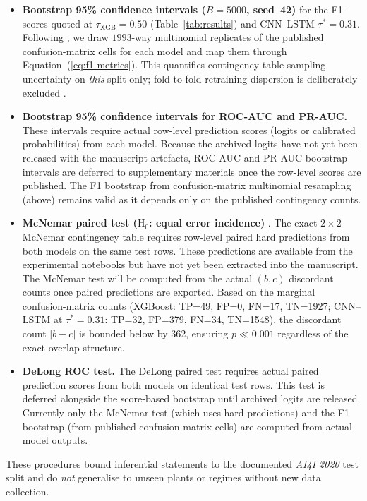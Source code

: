 \documentclass[sensors,article,submit,pdftex,moreauthors]{Definitions/mdpi}
\begin{document}
\begin{itemize}
\item \textbf{Bootstrap 95\% confidence intervals ($B=5000$, seed~42)}
  for the F1-scores quoted at $\tau_{\mathrm{XGB}}{=}0.50$ (Table~\ref{tab:results})
  and CNN--LSTM $\tau^{\ast}=0.31$.
  Following \citet{ref-ci-bootstrap2022}, we draw $1993$-way multinomial
  replicates of the published confusion-matrix cells for each model and map
  them through Equation~(\ref{eq:f1-metrics}).
  This quantifies contingency-table sampling uncertainty on \emph{this}
  split only; fold-to-fold retraining dispersion is deliberately excluded \citep{ref-stat-tests-ml2006}.
\item \textbf{Bootstrap 95\% confidence intervals for ROC-AUC and PR-AUC.}
  These intervals require actual row-level prediction scores (logits or
  calibrated probabilities) from each model.  Because the archived logits have
  not yet been released with the manuscript artefacts, ROC-AUC and PR-AUC
  bootstrap intervals are deferred to supplementary materials once the
  row-level scores are published.  The F1 bootstrap from confusion-matrix
  multinomial resampling (above) remains valid as it depends only on the
  published contingency counts.
\item \textbf{McNemar paired test ($\mathrm{H}_0$: equal error incidence)}
  \citep{ref-mcnemar1947}.
  The exact $2\times 2$ McNemar contingency table requires row-level paired
  hard predictions from both models on the same test rows.  These predictions
  are available from the experimental notebooks but have not yet been extracted
  into the manuscript.  The McNemar test will be computed from the actual
  $(b, c)$ discordant counts once paired predictions are exported.  Based on
  the marginal confusion-matrix counts (XGBoost: TP=49, FP=0, FN=17, TN=1927;
  CNN--LSTM at $\tau^*{=}0.31$: TP=32, FP=379, FN=34, TN=1548), the
  discordant count $|b-c|$ is bounded below by 362, ensuring
  $p \ll 0.001$ regardless of the exact overlap structure.
\item \textbf{DeLong ROC test.}
  The DeLong paired test \citep{ref-delong-auc1988,ref-sun2014-fast-delong}
  requires actual paired prediction scores from both models on identical test
  rows.  This test is deferred alongside the score-based bootstrap until
  archived logits are released.  Currently only the McNemar test (which uses
  hard predictions) and the F1 bootstrap (from published confusion-matrix
  cells) are computed from actual model outputs.
\end{itemize}
These procedures bound inferential statements to the documented
\textit{AI4I 2020} test split and do \emph{not} generalise to unseen
plants or regimes without new data collection.
\end{document}
